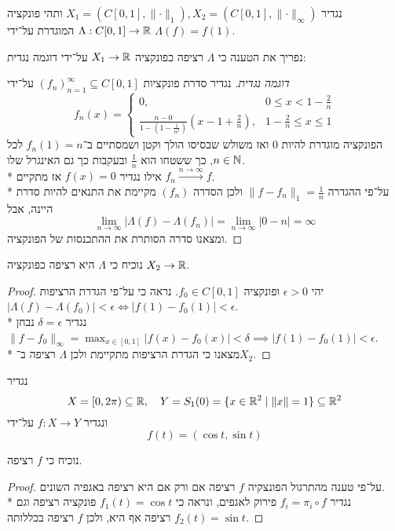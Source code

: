\Question{}
נגדיר $X_1 = (C[0, 1], \lVert \cdot \rVert_1), X_2 = (C[0, 1], \lVert \cdot \rVert_\infty)$ ותהי פונקציה $\Lambda : C[0, 1] \to \mathbb{R}$ המוגדרת על־ידי $\Lambda(f) = f(1)$.

\Subquestion{}
נפריך את הטענה כי $\Lambda$ רציפה כפונקציה $X_1 \to \mathbb{R}$ על־ידי דוגמה נגדית:
\begin{proof}[דוגמה נגדית]
	נגדיר סדרת פונקציות ${(f_n)}_{n = 1}^\infty \subseteq C[0, 1]$ על־ידי
	\[
		f_n(x) = \begin{cases}
			0, & 0 \le x < 1 - \frac{2}{n} \\
			\frac{n - 0}{1 - (1 - \frac{1}{n^2})}(x - 1 + \frac{2}{n}), & 1 - \frac{2}{n} \le x \le 1
		\end{cases}
	\]
	הפונקציה מוגדרת להיות $0$ ואז משולש שבסיסו הולך וקטן ושמסתיים ב־$f_n(1) = n$ לכל $n \in \mathbb{N}$, כך ששטחו הוא $\frac{1}{n}$ ובעקבות כך גם האינגרל שלו. \\*
	אילו נגדיר $f(x) = 0$ אז מתקיים $f_n \xrightarrow{n \to \infty} f$. \\*
	על־פי ההגדרה $\lVert f - f_n \rVert_1 = \frac{1}{n}$ ולכן הסדרה $(f_n)$ מקיימת את התנאים להיות סדרת היינה, אבל
	\[
		\lim_{n \to \infty} | \Lambda(f) - \Lambda(f_n) |
		= \lim_{n \to \infty} | 0 - n |
		= \infty
	\]
	ומצאנו סדרה הסותרת את ההתכנסות של הפונקציה.
\end{proof}

\Subquestion{}
נוכיח כי $\Lambda$ היא רציפה כפונקציה $X_2 \to \mathbb{R}$.
\begin{proof}
	יהי $\epsilon > 0$ ופונקציה $f_0 \in C[0, 1]$. נראה כי על־פי הגדרת הרציפות $| \Lambda(f) - \Lambda(f_0) | < \epsilon \iff |f(1) - f_0(1)| < \epsilon$. \\*
	נגדיר $\delta = \epsilon$ נבחן $\lVert f - f_0 \rVert_\infty = \max_{x \in [0, 1]}|f(x) - f_0(x)| < \delta \implies |f(1) - f_0(1)| < \epsilon$. \\*
	מצאנו כי הגדרת הרציפות מתקיימת ולכן $\Lambda$ רציפה ב־$X_2$.
\end{proof}

\Question{}
נגדיר
\[
	X = [0, 2 \pi) \subseteq \RR, \quad Y = S_1(0) = \{ x \in \RR^2 \mid \lVert x \rVert = 1 \} \subseteq \RR^2 %
\]
ונגדיר $f : X \to Y$ על־ידי
\[
	f(t) = (\cos t, \sin t)
\]

\Subquestion{}
נוכיח כי $f$ רציפה.
\begin{proof}
	על־פי טענה מהתרגול הפונצקיה $f$ רציפה אם ורק אם היא רציפה באגפיה השונים. \\*
	נגדיר $f_i = \pi_i \circ f$ פירוק לאגפים, ונראה כי $f_1(t) = \cos t$ פונקציה רציפה וגם $f_2(t) = \sin t$ רציפה אף היא, ולכן $f$ רציפה בכללותה.
\end{proof}

